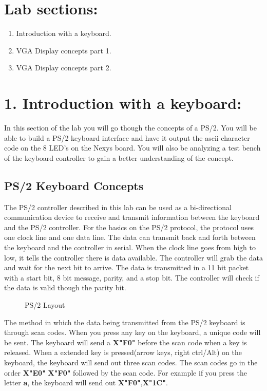 \documentclass{article}
\begin{document}
\section{Lab sections:}
\begin{enumerate}
  \item Introduction with a keyboard.
  \item VGA Display concepts part 1.
  \item VGA Display concepts part 2.
\end{enumerate}

\newpage
\section{1. Introduction with a keyboard:}
In this section of the lab you will go though the concepts of a PS/2. You will be able to build a PS/2 keyboard interface and have it output the ascii character code on the 8 LED's on the Nexys board. You will also be analyzing a test bench of the keyboard controller to gain a better understanding of the concept.

\subsection{PS/2 Keyboard Concepts}
The PS/2 controller described in this lab can be used as a bi-directional communication device to receive and transmit information between the keyboard and the PS/2 controller. For the basics on the PS/2 protocol, the protocol uses one clock line and one data line. The data can transmit back and forth between the keyboard and the controller in serial. When the clock line goes from high to low, it tells the controller there is data available. The controller will grab the data and wait for the next bit to arrive. The data is transmitted in a 11 bit packet with a start bit, 8 bit message, parity, and a stop bit. The controller will check if the data is valid though the parity bit.

\begin{figure}[!htbp]
  \centering
  \caption{PS/2 Layout}
\end{figure}

The method in which the data being transmitted from the PS/2 keyboard is through scan codes. When you press any key on the keyboard, a unique code will be sent. The keyboard will send a \textbf{X"F0"} before the scan code when a key is released. When a extended key is pressed(arrow keys, right ctrl/Alt) on the keyboard, the keyboard will send out three scan codes. The scan codes go in the order \textbf{X"E0"} \textbf{X"F0"} followed by the scan code. For example if you press the letter \textbf{a}, the keyboard will send out \textbf{X"F0"},\textbf{X"1C"}.
\end{document}
